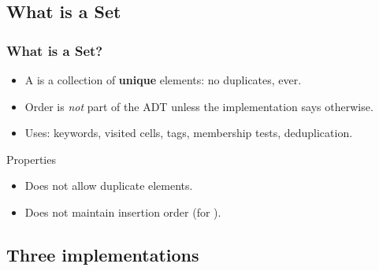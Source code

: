 \documentclass[aspectratio=169,10pt, compress]{beamer}
\begin{document}
\subsection[Concept]{What is a Set}




\begin{frame}[t,fragile] \frametitle{What is a Set?}
  \begin{itemize}
    \item A  is a collection of \textbf{unique} elements:
          no duplicates, ever.
    \item Order is \emph{not} part of the ADT unless the implementation
          says otherwise.
    \item Uses: keywords, visited cells, tags, membership tests,
          deduplication.
  \end{itemize}
  \begin{block}{Properties}
    \begin{itemize}
      \item Does not allow duplicate elements.
      \item Does not maintain insertion order (for ).
    \end{itemize}
  \end{block}
\end{frame}

\subsection[Classes]{Three implementations}
\end{document}
